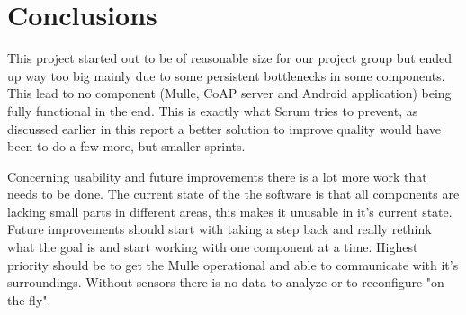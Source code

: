 


\section{Conclusions}
This project started out to be of reasonable size for our project group but ended up way too big mainly due to some persistent bottlenecks in some components.
This lead to no component (Mulle, CoAP server and Android application) being fully functional in the end.
This is exactly what Scrum tries to prevent, as discussed earlier in this report a better solution to improve quality would have been to do a few more, but smaller sprints.

Concerning usability and future improvements there is a lot more work that needs to be done.
The current state of the the software is that all components are lacking small parts in different areas, this makes it unusable in it's current state.
Future improvements should start with taking a step back and really rethink what the goal is and start working with one component at a time.
Highest priority should be to get the Mulle operational and able to communicate with it's surroundings.
Without sensors there is no data to analyze or to reconfigure "on the fly".
